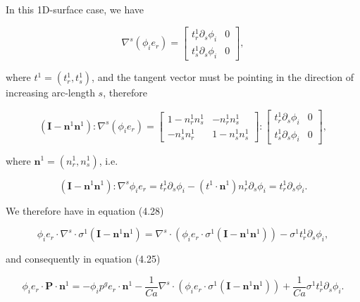 \documentclass{article}
\begin{document}
In this 1D-surface case, we have

\begin{equation}
\nabla^{s}(\phi_{i}e_{r}) = \left[ \begin{array}{cc}t_{r}^{1}\partial_{s}\phi_{i} & 0\\ t_{s}^{1}\partial_{s}\phi_{i} & 0 \end{array} \right], \tag{4.29}
\end{equation}

where \(t^{1} = (t_{r}^{1},t_{s}^{1})\), and the tangent vector must be pointing in the direction of increasing arc-length \(s\), therefore

\begin{equation}
(\pmb {I} - \pmb{n}^{1}\pmb{n}^{1}):\nabla^{s}(\phi_{i}e_{r}) = \left[ \begin{array}{cc}1 - n_{r}^{1}n_{s}^{1} & -n_{r}^{1}n_{s}^{1}\\ -n_{s}^{1}n_{r}^{1} & 1 - n_{s}^{1}n_{s}^{1} \end{array} \right]:\left[ \begin{array}{cc}t_{r}^{1}\partial_{s}\phi_{i} & 0\\ t_{s}^{1}\partial_{s}\phi_{i} & 0 \end{array} \right], \tag{4.30}
\end{equation}

where \(\pmb{n}^{1} = (n_{r}^{1},n_{s}^{1})\), i.e.

\begin{equation}
(\pmb {I} - \pmb{n}^{1}\pmb{n}^{1}):\nabla^{s}\phi_{i}e_{r} = t_{r}^{1}\partial_{s}\phi_{i} - (t^{1}\cdot \pmb{n}^{1})n_{r}^{1}\partial_{s}\phi_{i} = t_{r}^{1}\partial_{s}\phi_{i}. \tag{4.31}
\end{equation}

We therefore have in equation (4.28)

\begin{equation}
\phi_{i}e_{r}\cdot \nabla^{s}\cdot \sigma^{1}(\pmb {I} - \pmb{n}^{1}\pmb{n}^{1}) = \nabla^{s}\cdot (\phi_{i}e_{r}\cdot \sigma^{1}(\pmb {I} - \pmb{n}^{1}\pmb{n}^{1})) - \sigma^{1}t_{r}^{1}\partial_{s}\phi_{i}, \tag{4.32}
\end{equation}

and consequently in equation (4.25)

\begin{equation}
\phi_{i}e_{r}\cdot \pmb{P}\cdot \pmb{n}^{1} = -\phi_{i}p^{g}e_{r}\cdot \pmb{n}^{1} - \frac{1}{C a}\nabla^{s}\cdot (\phi_{i}e_{r}\cdot \sigma^{1}(\pmb {I} - \pmb{n}^{1}\pmb{n}^{1})) + \frac{1}{C a}\sigma^{1}t_{r}^{1}\partial_{s}\phi_{i}. \tag{4.33}
\end{equation}
\end{document}
